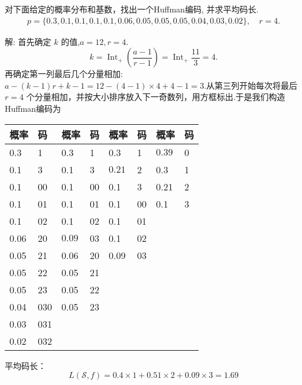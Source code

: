 \begin{tcolorbox}[breakable,colback=blue!5!white,colframe=blue!75!black,
 title= 解答题]
 对下面给定的概率分布和基数，找出一个Huffman编码, 并求平均码长.
$$
\begin{array}{l}
p=\{0.3,0.1,0.1,0.1,0.1,0.06,0.05,0.05,0.05,0.04,0.03,0.02\}, 
\quad r=4 .
\end{array}
$$

\tcblower
解: 首先确定 $ {k} $ 的值,$a=12,r=4$.
$$
k=\operatorname{I n t}_{+}\left(\frac{a-1}{r-1}\right)=\operatorname{I n t}_{+}\frac{11}{3}=4.
$$
再确定第一列最后几个分量相加:$a-(k-1) r+k-1 =12-(4-1) \times 4+4-1=3 $.从第三列开始每次将最后 $r=4$ 个分量相加，并按大小排序放入下一奇数列，用方框标出.于是我们构造Huffman编码为

\begin{center}
\begin{tabular}{ll||ll||ll||ll} 
\hline
概率 & 码 & 概率 & 码 & 概率 & 码& 概率 & 码 \\
\hline
0.3 & 1 & 0.3 & 1 & 0.3 & 1&$\boxed{0.39}$ &0 \\
0.1 & 3 & 0.1 & 3 & $\boxed{0.21}$ & 2 &0.3 &1 \\
0.1 & 00 & 0.1 & 00 & 0.1 & 3 &0.21 &2 \\
0.1 & 01 & 0.1 & 01 &0.1 &00 &0.1 &3 \\
0.1 & 02 & 0.1 & 02 &0.1 &01 & & \\
0.06 & 20 &$\boxed{0.09}$ &03 &0.1 &02 & & \\
0.05 & 21 &0.06 &20 &0.09 &03 & & \\
0.05 & 22 &0.05 &21 & & & & \\
0.05 & 23 &0.05 &22 & & & & \\
0.04 & 030 &0.05 &23 & & & & \\
0.03 & 031 & & & & & & \\
0.02 & 032 & & & & & & \\
\hline
\end{tabular}
\end{center}
平均码长：
$$ L(\mathscr{S}, f)=0.4\times 1+0.51 \times 2+0.09 \times 3=1.69 $$
\end{tcolorbox}


